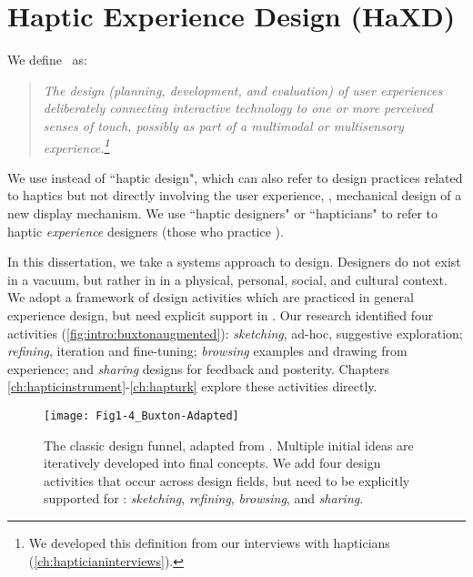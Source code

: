 \section{Haptic Experience Design (HaXD)}
We define \haxd\ as: %
\begin{quote}
\it The design (planning, development, and evaluation) of user experiences  deliberately connecting interactive technology to
one or more perceived senses of touch, possibly as part of a multimodal or multisensory experience.\footnote{We developed this definition from our interviews with hapticians (\autoref{ch:hapticianinterviews}).}
\end{quote}
We use \haxd instead of ``haptic design", which can also refer to design practices related to haptics but not directly involving the user experience, \eg, mechanical design of a new display mechanism. %
We use ``haptic designers" or ``hapticians" to refer to haptic \emph{experience} designers (those who practice \haxd).

In this dissertation, we take a systems approach to design.
Designers do not exist in a vacuum, but rather in in a physical, personal, social, and cultural context. %
We adopt a framework of design activities which are practiced in general experience design, but need explicit support in \haxd.
Our research identified four activities (\autoref{fig:intro:buxtonaugmented}): \emph{sketching}, ad-hoc, suggestive exploration; \emph{refining}, iteration and fine-tuning; \emph{browsing} examples and drawing from experience; and \emph{sharing} designs for feedback and posterity.
Chapters \ref{ch:hapticinstrument}-\ref{ch:hapturk} explore these activities directly. %





\begin{figure}[htbp] %
   \centering
   \texttt{[image: Fig1-4\_Buxton-Adapted]} 
   \caption{The classic design funnel, adapted from \citet{Buxton2007}.
   Multiple initial ideas are iteratively developed into final concepts.
   We add four design activities that occur across design fields, but need to be explicitly supported for \haxd: \textit{sketching}, \textit{refining}, \textit{browsing}, and \textit{sharing}.}
   \label{fig:intro:buxtonaugmented}
\end{figure}






